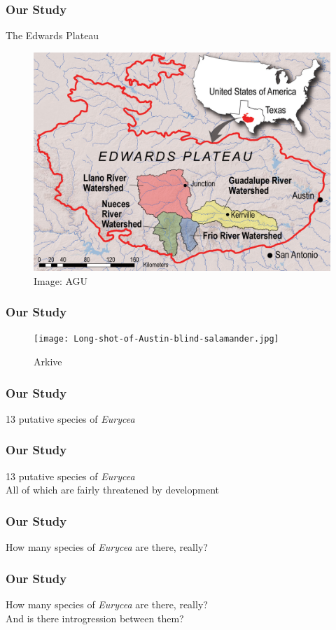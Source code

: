 \documentclass{beamer}
\begin{document}
\begin{frame}
\frametitle{Our Study}
\begin{block}{The Edwards Plateau}
\begin{figure}
    \includegraphics[scale=0.15]{pr_2010-06_map_hi-res.jpg}
    \caption{Image: AGU}
    \end{figure}
    \end{block}
\end{frame}

\begin{frame}
\frametitle{Our Study}
\begin{figure}
    \texttt{[image: Long-shot-of-Austin-blind-salamander.jpg]}
	\caption{Arkive}
    \end{figure}
\end{frame}

\begin{frame}
\frametitle{Our Study}
13 putative species of \textit{Eurycea}
\end{frame}

\begin{frame}
\frametitle{Our Study}
13 putative species of \textit{Eurycea} \\
All of which are fairly threatened by development
\end{frame}

\begin{frame}
\frametitle{Our Study}
How many species of \textit{Eurycea} are there, really? \\
\end{frame}

\begin{frame}
\frametitle{Our Study}
How many species of \textit{Eurycea} are there, really? \\
And is there introgression between them?
\end{frame}
\end{document}
